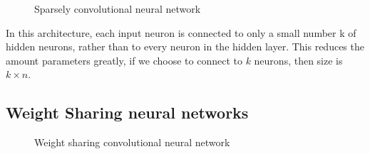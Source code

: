 \documentclass[11pt]{article}
\begin{document}
\begin{figure}[H]
    \centering
    \caption{Sparsely convolutional neural network}
\end{figure}

In this architecture, each input neuron is connected to only a small number k of hidden neurons, rather than to every neuron in the hidden layer. This reduces the amount parameters greatly, if we choose to connect to $k$ neurons, then size is $k\times n$.

\subsection{Weight Sharing neural networks }

\begin{figure}[H]
    \centering
    \caption{Weight sharing convolutional neural network}
\end{figure}
\end{document}
